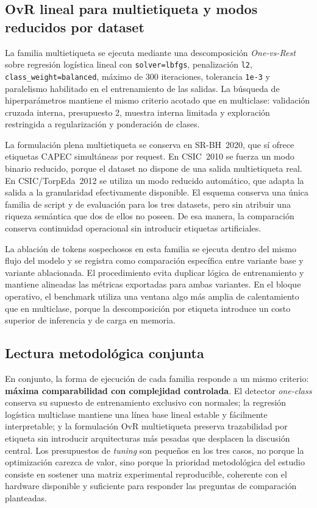 \documentclass[12pt,oneside]{report}
\begin{document}
\subsection{OvR lineal para multietiqueta y modos reducidos por dataset}
La familia multietiqueta se ejecuta mediante una descomposición \textit{One-vs-Rest} sobre regresión logística lineal con \texttt{solver=lbfgs}, penalización \texttt{l2}, \texttt{class\_weight=balanced}, máximo de 300 iteraciones, tolerancia \texttt{1e-3} y paralelismo habilitado en el entrenamiento de las salidas. La búsqueda de hiperparámetros mantiene el mismo criterio acotado que en multiclase: validación cruzada interna, presupuesto 2, muestra interna limitada y exploración restringida a regularización y ponderación de clases.

La formulación plena multietiqueta se conserva en SR-BH~2020, que sí ofrece etiquetas CAPEC simultáneas por request. En CSIC~2010 se fuerza un modo binario reducido, porque el dataset no dispone de una salida multietiqueta real. En CSIC/TorpEda~2012 se utiliza un modo reducido automático, que adapta la salida a la granularidad efectivamente disponible. El esquema conserva una única familia de script y de evaluación para los tres datasets, pero sin atribuir una riqueza semántica que dos de ellos no poseen. De esa manera, la comparación conserva continuidad operacional sin introducir etiquetas artificiales.

La ablación de tokens sospechosos en esta familia se ejecuta dentro del mismo flujo del modelo y se registra como comparación específica entre variante base y variante ablacionada. El procedimiento evita duplicar lógica de entrenamiento y mantiene alineadas las métricas exportadas para ambas variantes. En el bloque operativo, el benchmark utiliza una ventana algo más amplia de calentamiento que en multiclase, porque la descomposición por etiqueta introduce un costo superior de inferencia y de carga en memoria.

\subsection{Lectura metodológica conjunta}
En conjunto, la forma de ejecución de cada familia responde a un mismo criterio: \textbf{máxima comparabilidad con complejidad controlada}. El detector \textit{one-class} conserva su supuesto de entrenamiento exclusivo con normales; la regresión logística multiclase mantiene una línea base lineal estable y fácilmente interpretable; y la formulación OvR multietiqueta preserva trazabilidad por etiqueta sin introducir arquitecturas más pesadas que desplacen la discusión central. Los presupuestos de \textit{tuning} son pequeños en los tres casos, no porque la optimización carezca de valor, sino porque la prioridad metodológica del estudio consiste en sostener una matriz experimental reproducible, coherente con el hardware disponible y suficiente para responder las preguntas de comparación planteadas.
\end{document}
